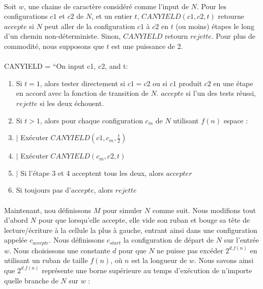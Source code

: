 \paragraph{} 
Soit $w$, une chaine de caractère considéré comme l'input de $N$. Pour les configurations $c1$ et $c2$ de $N$, et un entier $t$, $CANYIELD(c1, c2, t)$ retourne $accepte$ si $N$ peut aller de la configuration $c1$ à $c2$ en $t$ (ou moins) étapes le long d'un chemin non-déterministe. Sinon, $CANYIELD$ retourn $rejette$. Pour plus de commodité, nous supposons que $t$ est une puissance de 2.
\paragraph{}
CANYIELD = “On input c1, c2, and t:
\begin{enumerate}
\item Si $t = 1$, alors tester directement si $c1 = c2$ ou si $c1$ produit $c2$ en une étape en accord avec la fonction de transition de $N$. $accepte$ si l'un des tests réussi, $rejette$ si les deux échouent.
\item Si $t > 1$, alors pour chaque configuration $c_{m}$ de $N$ utilisant $f(n)$ espace :
\item $| $ Exécuter $CANYIELD(c1, c_{m}, \frac{t}{2})$
\item $| $ Exécuter $CANYIELD(c_{m}, c2, t)$
\item $| $ Si l'étape 3 et 4 acceptent tous les deux, alors $accepter$
\item Si toujours pas d'$accepte$, alors $rejette$
\end{enumerate}
\paragraph{}
Maintenant, nou définissons $M$ pour simuler $N$ comme suit. Nous modifions tout d'abord $N$ pour que lorsqu'elle accepte, elle vide son ruban et bouge sa tête de lecture/écriture à la cellule la plus à gauche, entrant ainsi dans une configuration appelée $c_{accepte}$. Nous définissons $c_{start}$ la configuration de départ de $N$ sur l'entrée $w$. Nous choisissons une constante $d$ pour que $N$ ne puisse pas excéder $2^{d.f(n)}$ en utilisant un ruban de taille $f(n)$, où $n$ est la longueur de $w$. Nous savons ainsi que $2^{d.f(n)}$ représente une borne supérieure au temps d’exécution de n’importe quelle branche de $N$ sur $w$ :
